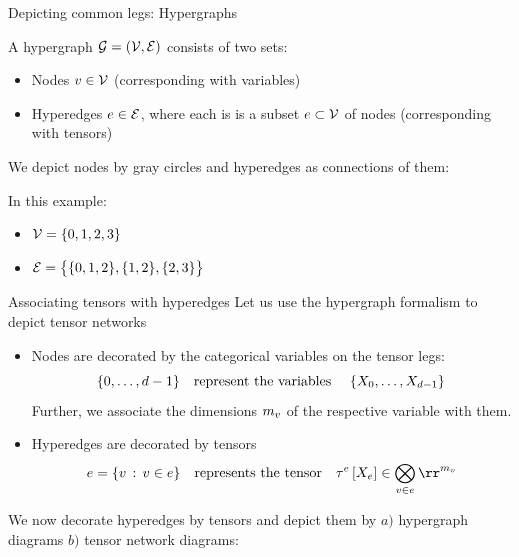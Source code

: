 \documentclass{beamer}
\begin{document}
    \begin{frame}{Depicting common legs: Hypergraphs}
        \begin{definition}[Hypergraph]
            A hypergraph $\mathcal{G}=(\mathcal{V},\mathcal{E})$ consists of two sets:
            \begin{itemize}
                \item Nodes $v\in\mathcal{V}$ (corresponding with variables)
                \item Hyperedges $e\in\mathcal{E}$, where each is is a subset $e\subset\mathcal{V}$ of nodes (corresponding with tensors)
            \end{itemize}
        \end{definition}
        We depict nodes by gray circles and hyperedges as connections of them:
        \begin{center}
            
        \end{center}
        \vspace{-1cm}
        In this example:
        \begin{itemize}
            \item $\mathcal{V} = \{0,1,2,3\}$
            \item $\mathcal{E} = \big\{ \{0,1,2\}, \{1,2\}, \{2,3\}  \big\}$
        \end{itemize}
    \end{frame}

    \begin{frame}{Associating tensors with hyperedges}
        Let us use the hypergraph formalism to depict tensor networks
        \begin{itemize}
            \item Nodes are decorated by the categorical variables on the tensor legs:
            \[  \{0,\ldots,d-1\} \quad \text{represent the variables } \quad \{X_{0},\ldots,X_{d-1}\}\]
            Further, we associate the dimensions $m_{v}$ of the respective variable with them.
            \item Hyperedges are decorated by tensors
            \[ \edge = \{\node \, : \, \node \in \edge \} \quad \text{represents the tensor} \quad \hypercoreofat{\edge}{\catvariableof{\edge}} \in \bigotimes_{\node\in\edge} \rr^{\catdimof{\node}}\]
        \end{itemize}
        We now decorate hyperedges by tensors and depict them by $a)$ hypergraph diagrams $b)$ tensor network diagrams:
        \begin{center}
            
        \end{center}
    \end{frame}
\end{document}
